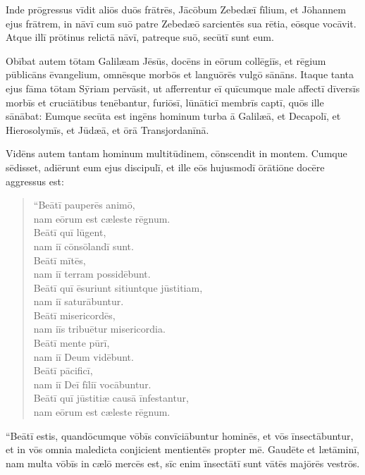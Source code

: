\Versus Inde prōgressus vīdit aliōs duōs frātrēs, Jācōbum Zebedæī fīlium, et Jōhannem ejus frātrem, in nāvī cum suō patre Zebedæō sarcientēs sua rētia, eōsque vocāvit. 
\Versus Atque illī prōtinus relictā nāvī, patreque suō, secūtī sunt eum.

\Versus Obībat autem tōtam Galilæam Jēsūs, docēns in eōrum collēgiīs, et rēgium pūblicāns ēvangelium, omnēsque morbōs et languōrēs vulgō sānāns. 
\Versus Itaque tanta ejus fāma tōtam Sȳriam pervāsit, ut afferrentur eī quīcumque male affectī dīversīs morbīs et cruciātibus tenēbantur, furiōsī, lūnāticī membrīs captī, quōs ille sānābat: 
\Versus Eumque secūta est ingēns hominum turba ā Galilæā, et Decapolī, et Hierosolymīs, et Jūdæā, et ōrā Transjordanīnā.
 

\Caput
\Versus Vidēns autem tantam hominum multitūdinem, cōnscendit in montem. Cumque sēdisset, adiērunt eum ejus discipulī, 
\Versus et ille eōs hujusmodī ōrātiōne docēre aggressus est:


\begin{verse}
\begin{patverse*}
\Versus ``Beātī pauperēs animō,\\
nam eōrum est cæleste rēgnum.\\
\Versus Beātī quī lūgent,\\
nam iī cōnsōlandī sunt.\\
\Versus Beātī mītēs,\\
nam iī terram possidēbunt.\\
\Versus Beātī quī ēsuriunt sitiuntque jūstitiam,\\
nam iī saturābuntur.\\
\Versus Beātī misericordēs,\\
nam iīs tribuētur misericordia.\\
\Versus Beātī mente pūrī,\\
nam iī Deum vidēbunt.\\
\Versus Beātī pācificī,\\
nam iī Deī fīliī vocābuntur.\\
\Versus Beātī quī jūstitiæ causā īnfestantur,\\
nam eōrum est cæleste rēgnum.
\end{patverse*}
\end{verse}

\Versus ``Beātī estis, quandōcumque vōbīs convīciābuntur hominēs, et vōs īnsectābuntur, et in vōs omnia maledicta conjicient mentientēs propter mē. 
\Versus Gaudēte et lætāminī, nam multa vōbīs in cælō mercēs est, sīc enim īnsectātī sunt vātēs majōrēs vestrōs.

